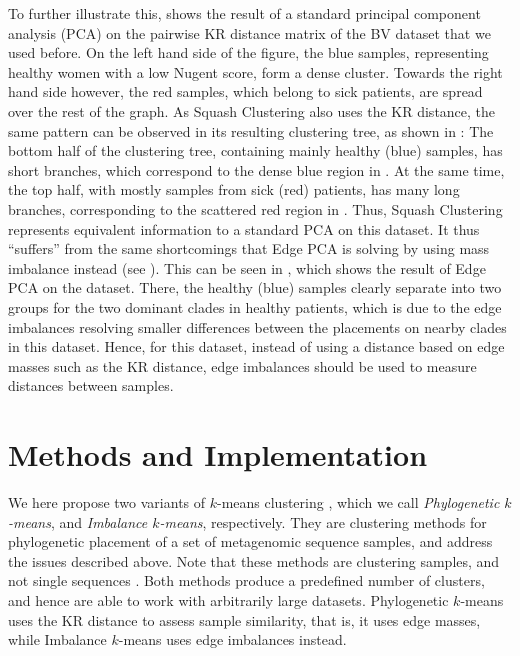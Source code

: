 To further illustrate this,  shows
the result of a standard principal component analysis (PCA) \cite{Pearson1901,Jolliffe2002}
on the pairwise KR distance matrix of the \acf{BV} dataset \cite{Srinivasan2012} that we used before.
On the left hand side of the figure, the blue samples,
representing healthy women with a low Nugent score, form a dense cluster.
Towards the right hand side however, the red samples, which belong to sick patients, are spread over the rest of the graph.
As Squash Clustering also uses the KR distance, the same pattern can be observed in its resulting clustering tree,
as shown in :
The bottom half of the clustering tree, containing mainly healthy (blue) samples, has short branches,
which correspond to the dense blue region in .
At the same time, the top half, with mostly samples from sick (red) patients, has many long branches,
corresponding to the scattered red region in .
Thus, Squash Clustering represents equivalent information to a standard PCA on this dataset.
It thus ``suffers'' from the same shortcomings that Edge PCA is solving by using mass imbalance instead
(see ).
This can be seen in , which shows the result of Edge PCA on the dataset.
There, the healthy (blue) samples clearly separate
into two groups for the two dominant  clades in healthy patients,
which is due to the edge imbalances resolving smaller differences between the placements on nearby clades in this dataset.
Hence, for this dataset, instead of using a distance based on edge masses such as the KR distance,
edge imbalances should be used to measure distances between samples.


\section{Methods and Implementation}
\label{ch:Clustering:sec:Methods}

We here propose two variants of $k$-means clustering \cite{Steinhaus1956,Macqueen1967},
which we call \emph{Phylogenetic $k$-means}, and \emph{Imbalance $k$-means}, respectively.
They are clustering methods for phylogenetic placement of a set of metagenomic sequence samples,
and address the issues described above.
Note that these methods are clustering samples, and not single sequences \cite{Kelley2010}.
Both methods produce a predefined number of clusters, and hence are able to work with arbitrarily large datasets.
Phylogenetic $k$-means uses the KR distance to assess sample similarity, that is, it uses edge masses,
while Imbalance $k$-means uses edge imbalances instead.

